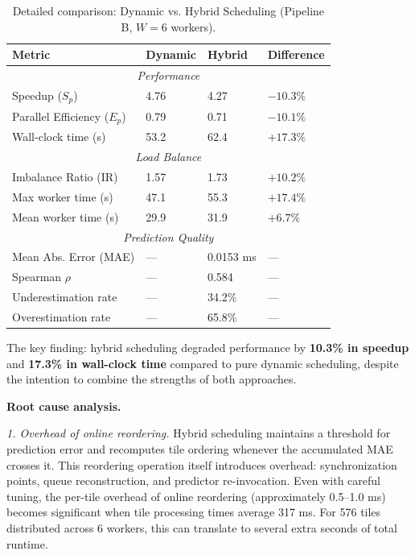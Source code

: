 \documentclass[acmsmall]{acmart}
\begin{document}
\begin{table}[htbp]
  \centering
  \caption{Detailed comparison: Dynamic vs. Hybrid Scheduling (Pipeline B, $W=6$ workers).}
  \label{tab:hybrid_analysis}
  \small
  \begin{tabularx}{\linewidth}{lXXX}
    \toprule
    \textbf{Metric} & \textbf{Dynamic} & \textbf{Hybrid} & \textbf{Difference} \\
    \midrule
    \multicolumn{4}{c}{\textit{Performance}} \\
    Speedup ($S_p$)              & 4.76 & 4.27 & $-10.3\%$ \\
    Parallel Efficiency ($E_p$)  & 0.79 & 0.71 & $-10.1\%$ \\
    Wall-clock time (s)          & 53.2 & 62.4 & $+17.3\%$ \\
    \midrule
    \multicolumn{4}{c}{\textit{Load Balance}} \\
    Imbalance Ratio (IR)         & 1.57 & 1.73 & $+10.2\%$ \\
    Max worker time (s)          & 47.1 & 55.3 & $+17.4\%$ \\
    Mean worker time (s)         & 29.9 & 31.9 & $+6.7\%$ \\
    \midrule
    \multicolumn{4}{c}{\textit{Prediction Quality}} \\
    Mean Abs. Error (MAE)        & --- & 0.0153 ms & --- \\
    Spearman $\rho$              & --- & 0.584 & --- \\
    Underestimation rate         & --- & 34.2\% & --- \\
    Overestimation rate          & --- & 65.8\% & --- \\
    \bottomrule
  \end{tabularx}
\end{table}

The key finding: hybrid scheduling degraded performance by \textbf{10.3\% in speedup} and \textbf{17.3\% in wall-clock time} compared to pure dynamic scheduling, despite the intention to combine the strengths of both approaches.

\textbf{Root cause analysis.}

\noindent\textit{1. Overhead of online reordering.} 
Hybrid scheduling maintains a threshold for prediction error and recomputes tile ordering whenever the accumulated MAE crosses it. 
This reordering operation itself introduces overhead: synchronization points, queue reconstruction, and predictor re-invocation. 
Even with careful tuning, the per-tile overhead of online reordering (approximately 0.5--1.0 ms) becomes significant when tile processing times average 317 ms. 
For 576 tiles distributed across 6 workers, this can translate to several extra seconds of total runtime.
\end{document}
